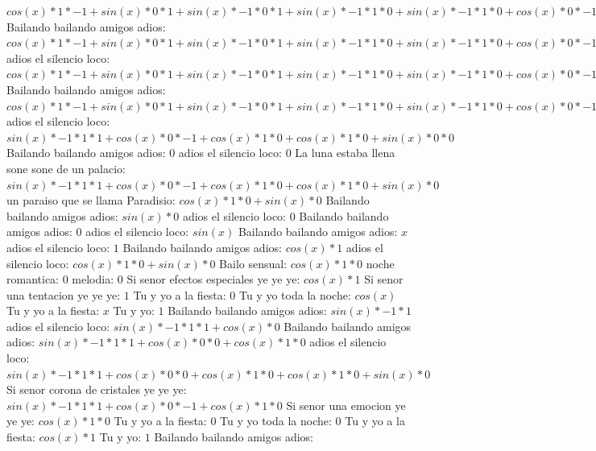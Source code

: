 \documentclass{article}
\begin{document}
${{{cos(x)*1*-1+sin(x)*0}*1+sin(x)*-1*0}*1+sin(x)*-1*1*0+sin(x)*-1*1*0+cos(x)*0}*-1+{sin(x)*-1*1*1+cos(x)*0}*0+{sin(x)*-1*1*1+cos(x)*0}*0+cos(x)*1*0+{sin(x)*-1*1*1+cos(x)*0}*0+cos(x)*1*0+cos(x)*1*0+sin(x)*0$ Bailando bailando amigos adios: ${{{{cos(x)*1*-1+sin(x)*0}*1+sin(x)*-1*0}*1+sin(x)*-1*1*0+sin(x)*-1*1*0+cos(x)*0}*-1+{sin(x)*-1*1*1+cos(x)*0}*0+{sin(x)*-1*1*1+cos(x)*0}*0+cos(x)*1*0+{sin(x)*-1*1*1+cos(x)*0}*0+cos(x)*1*0+cos(x)*1*0+sin(x)*0}*0+{{sin(x)*-1*1*1+cos(x)*0}*-1+cos(x)*1*0+cos(x)*1*0+sin(x)*0}*0$ adios el silencio loco: ${{{{cos(x)*1*-1+sin(x)*0}*1+sin(x)*-1*0}*1+sin(x)*-1*1*0+sin(x)*-1*1*0+cos(x)*0}*-1+{sin(x)*-1*1*1+cos(x)*0}*0+{sin(x)*-1*1*1+cos(x)*0}*0+cos(x)*1*0+{sin(x)*-1*1*1+cos(x)*0}*0+cos(x)*1*0+cos(x)*1*0+sin(x)*0}*0+{{sin(x)*-1*1*1+cos(x)*0}*-1+cos(x)*1*0+cos(x)*1*0+sin(x)*0}*0+{{sin(x)*-1*1*1+cos(x)*0}*-1+cos(x)*1*0+cos(x)*1*0+sin(x)*0}*0+{cos(x)*1*-1+sin(x)*0}*0$ Bailando bailando amigos adios: ${{{{cos(x)*1*-1+sin(x)*0}*1+sin(x)*-1*0}*1+sin(x)*-1*1*0+sin(x)*-1*1*0+cos(x)*0}*-1+{sin(x)*-1*1*1+cos(x)*0}*0+{sin(x)*-1*1*1+cos(x)*0}*0+cos(x)*1*0+{sin(x)*-1*1*1+cos(x)*0}*0+cos(x)*1*0+cos(x)*1*0+sin(x)*0}*1+{{sin(x)*-1*1*1+cos(x)*0}*-1+cos(x)*1*0+cos(x)*1*0+sin(x)*0}*0$  \newline adios el silencio loco: ${{sin(x)*-1*1*1+cos(x)*0}*-1+cos(x)*1*0+cos(x)*1*0+sin(x)*0}*0$ Bailando bailando amigos adios: $0$ adios el silencio loco: $0$  \newline La luna estaba llena sone sone de un palacio: ${sin(x)*-1*1*1+cos(x)*0}*-1+cos(x)*1*0+cos(x)*1*0+sin(x)*0$  \newline un paraiso que se llama Paradisio: $cos(x)*1*0+sin(x)*0$  \newline Bailando bailando amigos adios: $sin(x)*0$ adios el silencio loco: $0$ Bailando bailando amigos adios: $0$  \newline adios el silencio loco: $sin(x)$  \newline Bailando bailando amigos adios: $x$ adios el silencio loco: $1$  \newline Bailando bailando amigos adios: $cos(x)*1$ adios el silencio loco: $cos(x)*1*0+sin(x)*0$ Bailo sensual: $cos(x)*1*0$ noche romantica: $0$ melodia: $0$  \newline Si senor efectos especiales ye ye ye: $cos(x)*1$ Si senor una tentacion ye ye ye: $1$ Tu y yo a la fiesta: $0$  \newline Tu y yo toda la noche: $cos(x)$  \newline Tu y yo a la fiesta: $x$ Tu y yo: $1$  \newline Bailando bailando amigos adios: $sin(x)*-1*1$ adios el silencio loco: $sin(x)*-1*1*1+cos(x)*0$ Bailando bailando amigos adios: ${sin(x)*-1*1*1+cos(x)*0}*0+cos(x)*1*0$ adios el silencio loco: ${sin(x)*-1*1*1+cos(x)*0}*0+cos(x)*1*0+cos(x)*1*0+sin(x)*0$ Si senor corona de cristales ye ye ye: ${sin(x)*-1*1*1+cos(x)*0}*-1+cos(x)*1*0$  \newline Si senor una emocion ye ye ye: $cos(x)*1*0$ Tu y yo a la fiesta: $0$ Tu y yo toda la noche: $0$  \newline Tu y yo a la fiesta: $cos(x)*1$ Tu y yo: $1$ Bailando bailando amigos adios: 
\end{document}
